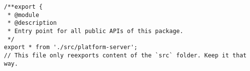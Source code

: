 \begin{verbatim}
/**export {
 * @module
 * @description
 * Entry point for all public APIs of this package.
 */
export * from './src/platform-server';
// This file only reexports content of the `src` folder. Keep it that way.
\end{verbatim}
